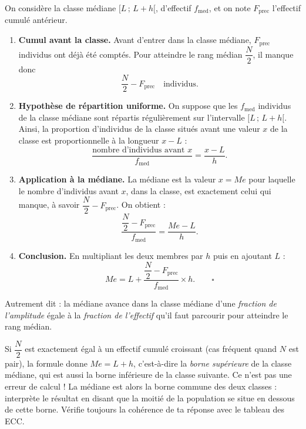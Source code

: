 \documentclass[11pt]{article}
\begin{document}
\begin{experience}
On considère la classe médiane $[L \,;\, L+h[$, d'effectif $f_{\text{med}}$, et on note $F_{\text{prec}}$ l'effectif cumulé antérieur.
\begin{enumerate}
\item \textbf{Cumul avant la classe.} Avant d'entrer dans la classe médiane, $F_{\text{prec}}$ individus ont déjà été comptés. Pour atteindre le rang médian $\dfrac{N}{2}$, il manque donc
\[ \frac{N}{2} - F_{\text{prec}} \quad \text{individus}. \]
\item \textbf{Hypothèse de répartition uniforme.} On suppose que les $f_{\text{med}}$ individus de la classe médiane sont répartis régulièrement sur l'intervalle $[L \,;\, L+h[$. Ainsi, la proportion d'individus de la classe situés avant une valeur $x$ de la classe est proportionnelle à la longueur $x - L$ :
\[ \frac{\text{nombre d'individus avant } x}{f_{\text{med}}} = \frac{x - L}{h}. \]
\item \textbf{Application à la médiane.} La médiane est la valeur $x = Me$ pour laquelle le nombre d'individus avant $x$, dans la classe, est exactement celui qui manque, à savoir $\dfrac{N}{2} - F_{\text{prec}}$. On obtient :
\[ \frac{\dfrac{N}{2} - F_{\text{prec}}}{f_{\text{med}}} = \frac{Me - L}{h}. \]
\item \textbf{Conclusion.} En multipliant les deux membres par $h$ puis en ajoutant $L$ :
\[ Me = L + \frac{\dfrac{N}{2} - F_{\text{prec}}}{f_{\text{med}}} \times h. \qquad \square \]
\end{enumerate}
Autrement dit : la médiane avance dans la classe médiane d'une \emph{fraction de l'amplitude} égale à la \emph{fraction de l'effectif} qu'il faut parcourir pour atteindre le rang médian.
\end{experience}

\begin{attention}
Si $\dfrac{N}{2}$ est exactement égal à un effectif cumulé croissant (cas fréquent quand $N$ est pair), la formule donne $Me = L + h$, c'est-à-dire la \emph{borne supérieure} de la classe médiane, qui est aussi la borne inférieure de la classe suivante. Ce n'est pas une erreur de calcul ! La médiane est alors la borne commune des deux classes : interprète le résultat en disant que la moitié de la population se situe en dessous de cette borne. Vérifie toujours la cohérence de ta réponse avec le tableau des ECC.
\end{attention}
\end{document}
